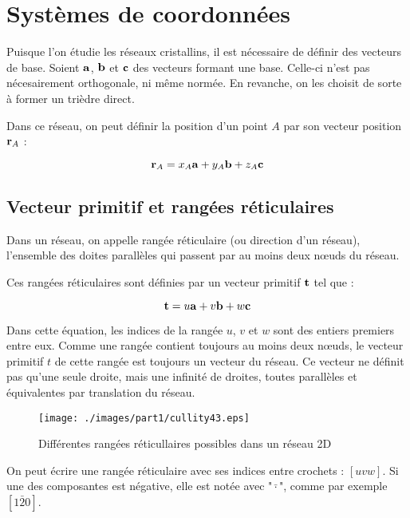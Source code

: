 \section{Systèmes de coordonnées}

Puisque l'on étudie les réseaux cristallins, il est nécessaire de définir des
vecteurs de base. Soient $\mathbf{a}$, $\mathbf{b}$ et $\mathbf{c}$ des vecteurs
formant une base. Celle-ci n'est pas nécesairement orthogonale, ni même normée.
En revanche, on les choisit de sorte à former un trièdre direct.

Dans ce réseau, on peut définir la position d'un point $A$ par son vecteur 
position $\mathbf{r}_A$ :

\begin{equation}
    \mathbf{r}_A = x_A \mathbf{a} + y_A \mathbf{b} + z_A \mathbf{c}
\end{equation}


\subsection{Vecteur primitif et rangées réticulaires}

Dans un réseau, on appelle rangée réticulaire (ou direction d'un réseau), 
l'ensemble des doites parallèles qui passent par au moins deux nœuds du réseau.

Ces rangées réticulaires sont définies par un vecteur primitif $\mathbf{t}$ tel que :

\begin{equation}
    \mathbf{t} = u \mathbf{a} + v \mathbf{b} + w \mathbf{c}
\end{equation}

Dans cette équation, les indices de la rangée $u$, $v$ et $w$ sont des entiers
premiers entre eux. Comme une rangée contient toujours au moins deux nœuds, le
vecteur primitif $t$ de cette rangée est toujours un vecteur du réseau. Ce
vecteur ne définit pas qu'une seule droite, mais une infinité de droites, toutes
parallèles et équivalentes par translation du réseau.

\begin{figure}
    \texttt{[image: ./images/part1/cullity43.eps]}
    \caption{Différentes rangées réticullaires possibles dans un réseau 2D}
    \label{fig:rangees2D}
\end{figure}

On peut écrire une rangée réticulaire avec ses indices entre crochets :
$[uvw]$. Si une des composantes est négative, elle est notée avec "$\bar{\cdot}$",
comme par exemple $[1\bar{2}0]$.

